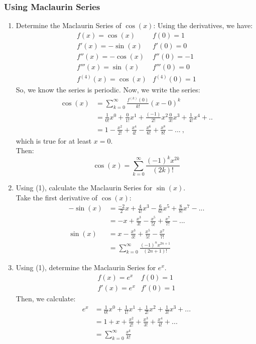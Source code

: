 \documentclass{article}
\begin{document}
\subsubsection{Using Maclaurin Series}
\begin{enumerate}
    \item Determine the Maclaurin Series of $\cos(x)$:
    Using the derivatives, we have:
    \begin{align*}
        f(x) = \cos(x) & f(0) = 1\\
        f'(x) = -\sin(x) & f'(0) = 0\\
        f''(x) = -\cos(x) & f''(0) = -1\\
        f'''(x) = \sin(x) & f'''(0) = 0\\
        f^{(4)}(x) = \cos(x) & f^{(4)}(0) = 1
    \end{align*}
    So, we know the series is periodic. Now, we write the series:
    \begin{align*}
        \cos(x) & = \sum_{k=0}^\infty \frac{f^{(k)}(0)}{k!}(x-0)^k\\
        & = \frac{1}{0!}x^0 + \frac{0}{1!}x^1 + \frac{(-1)}{2!}x^2 \frac{0}{3!}x^3 + \frac{1}{4!}x^4 + ..\\
        & = 1 - \frac{x^2}{2!} + \frac{x^4}{4!} - \frac{x^6}{6!} + \frac{x^8}{8!} - ... \ ,
    \end{align*}
    which is true for at least $x = 0$.\\
    Then:
    $$\cos(x) = \sum_{k=0}^\infty \frac{(-1)^kx^{2k}}{(2k)!}$$
    
    \item Using (1), calculate the Maclaurin Series for $\sin(x)$.\\
    Take the first derivative of $\cos(x)$:
    \begin{align*}
        -\sin(x) & = \frac{-2}{2}x + \frac{4}{4!}x^3 - \frac{6}{6!}x^5 + \frac{8}{8!}x^7 - ...\\
        & = -x + \frac{x^3}{3!} - \frac{x^5}{5!} + \frac{x^7}{7!} - ...\\
        \sin(x) & = x - \frac{x^3}{3!} + \frac{x^5}{5!} - \frac{x^7}{7!}\\
        & = \sum_{k=0}^\infty \frac{(-1)^n x^{2n+1}}{(2n+1)!}
    \end{align*}
    
    \item Using (1), determine the Maclaurin Series for $e^x$.
    \begin{align*}
        f(x) = e^x & f(0) = 1\\
        f'(x) = e^x & f'(0) = 1
    \end{align*}
    Then, we calculate:
    \begin{align*}
        e^x & = \frac{1}{0!}x^0 + \frac{1}{1!}x^1 + \frac{1}{2!}x^2 + \frac{1}{3!}x^3 + ...\\
        & = 1 + x + \frac{x^2}{2!} + \frac{x^3}{3!} + \frac{x^4}{4!} + ...\\
        & = \sum_{k=0}^\infty \frac{x^k}{k!}
    \end{align*}
\end{enumerate}
\end{document}
